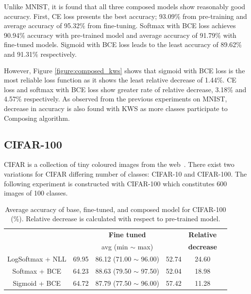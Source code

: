 \documentclass{article}
\begin{document}
Unlike MNIST, it is found that all three composed models show reasonably good accuracy. First, CE loss presents the best accuracy; 93.09\% from pre-training and average accuracy of 95.32\% from fine-tuning. Softmax with BCE loss achieves 90.94\% accuracy with pre-trained model and average accuracy of 91.79\% with fine-tuned models. Sigmoid with BCE loss leads to the least accuracy of 89.62\% and 91.31\% respectively.

However, Figure \ref{figure:composed_kws} shows that sigmoid with BCE loss is the most reliable loss function as it shows the least relative decrease of 1.44\%. CE loss and softmax with BCE loss show greater rate of relative decrease, 3.18\% and 4.57\% respectively. As observed from the previous experiments on MNIST, decrease in accuracy is also found with KWS as more classes participate to Composing algorithm.

\subsection{CIFAR-100}
CIFAR is a collection of tiny coloured images from the web~\cite{krizhevsky2009learning}. There exist two variations for CIFAR differing number of classes: CIFAR-10 and CIFAR-100. The following experiment is constructed with CIFAR-100 which constitutes 600 images of 100 classes.

\begin{table}[t]
    \centering
    \begin{tabular}{cccccc}
        \toprule[1pt]
        \multirow{2}{*}{\raisebox{-3\heavyrulewidth}{\bf Loss function}} &
        \multirow{2}{*}{\raisebox{-3\heavyrulewidth}{\bf Pre-trained }} &
        \textbf{Fine tuned} &
        \multirow{2}{*}{\raisebox{-3\heavyrulewidth}{ \bf Composed }} &
        \textbf{ Relative } \\
        & & avg (min $\sim$ max) & & \textbf{ decrease } \\
        \midrule
        LogSoftmax + NLL & 69.95 & 86.12 (71.00 $\sim$ 96.00) & 52.74 & 24.60 \\
        Softmax + BCE & 64.23 & 88.63 (79.50 $\sim$ 97.50) & 52.04 & 18.98 \\
        Sigmoid + BCE & 64.72 & 87.79 (77.50 $\sim$ 96.00) & 57.42 & 11.28 \\
        \bottomrule[1pt]
    \end{tabular}
    \caption{Average accuracy of base, fine-tuned, and composed model for CIFAR-100 (\%). Relative decrease is calculated with respect to pre-trained model.}
    \label{table:cifar}
\end{table}
\end{document}
